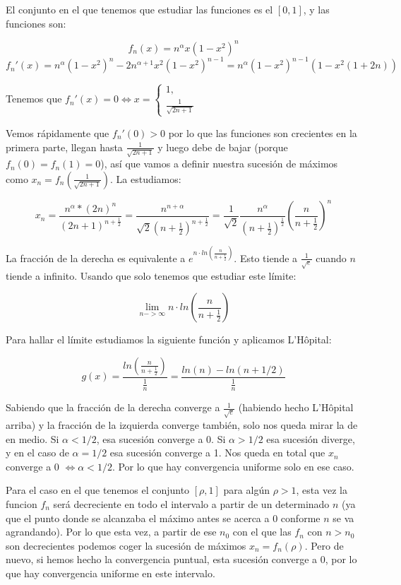 
El conjunto en el que tenemos que estudiar las funciones es el $[0,1]$, y las funciones son:

$$f_n(x) = n^\alpha x(1-x^2)^n$$ 
$$f_n'(x) = n^\alpha(1-x^2)^n - 2n^{\alpha+1}x^2(1-x^2)^{n-1} = n^\alpha(1-x^2)^{n-1}(1-x^2(1+2n))$$

Tenemos que $f_n '(x) = 0 \iff x=\left\{
\begin{array}{l}
1, \\
\frac{1}{\sqrt{2n+1}}
\end{array}\right.$

Vemos rápidamente que $f_n'(0) > 0$ por lo que las funciones son crecientes en la primera parte, llegan hasta $\frac{1}{\sqrt{2n+1}}$ y luego debe de bajar (porque $f_n(0) = f_n(1) = 0$), así que vamos a definir nuestra sucesión de máximos como $x_n = f_n\left(\frac{1}{\sqrt{2n+1}}\right)$. La estudiamos:

$$x_n = \frac{n^\alpha*(2n)^n}{(2n+1)^{n+\frac{1}{2}}} =  \frac{n^{n+\alpha}}{\sqrt 2(n+\frac{1}{2})^{n+\frac{1}{2}}} = \frac{1}{\sqrt 2}\frac{n^\alpha}{(n+\frac{1}{2})^{\frac{1}{2}}}\left(\frac{n}{n+\frac{1}{2}}\right)^n$$

La fracción de la derecha es equivalente a $e^{n\cdot ln\left(\frac{n}{n+\frac{1}{2}}\right)}$. Esto tiende a $\frac{1}{\sqrt e}$ cuando $n$ tiende a infinito. Usando que solo tenemos que estudiar este límite:

$$\lim\limits_{n->\infty} n\cdot ln\left(\frac{n}{n+\frac{1}{2}}\right)$$

Para hallar el límite estudiamos la siguiente función y aplicamos L'Hôpital:

$$g(x) = \frac{ln\left(\frac{n}{n+{\frac{1}{2}}}\right)}{\frac{1}{n}} = \frac{ln(n)-ln(n+1/2)}{\frac{1}{n}}$$



Sabiendo que la fracción de la derecha converge a $\frac{1}{\sqrt e}$ (habiendo hecho L'Hôpital arriba) y la fracción de la izquierda converge también, solo nos queda mirar la de en medio. Si $\alpha < 1/2$, esa sucesión converge a 0. Si $\alpha > 1/2$ esa sucesión diverge, y en el caso de $\alpha = 1/2$ esa sucesión converge a 1. Nos queda en total que ${x_n}$ converge a 0 $\iff \alpha < 1/2$. Por lo que hay convergencia uniforme solo en ese caso.

Para el caso en el que tenemos el conjunto $[\rho, 1]$ para algún $\rho > 1$, esta vez la funcion $f_n$ será decreciente en todo el intervalo a partir de un determinado $n$ (ya que el punto donde se alcanzaba el máximo antes se acerca a 0 conforme $n$ se va agrandando). Por lo que esta vez, a partir de ese $n_0$ con el que las $f_n$ con $n>n_0$ son decrecientes podemos coger la sucesión de máximos $x_n = f_n(\rho)$. Pero de nuevo, si hemos hecho la convergencia puntual, esta sucesión converge a 0, por lo que hay convergencia uniforme en este intervalo.
